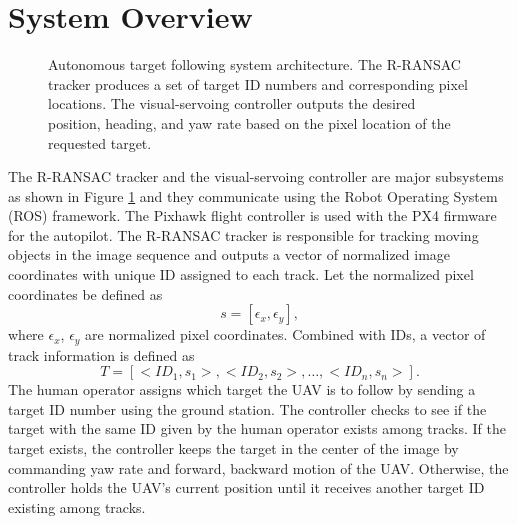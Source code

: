 \section{System Overview}
\begin{figure}[htbp]
	\centering
	\caption[Autonomous target following system architecture.]{Autonomous target following system architecture. The R-RANSAC tracker produces a set of target ID numbers and corresponding pixel locations. The visual-servoing controller outputs the desired position, heading, and yaw rate based on the pixel location of the requested target.}
	\label{system}
\end{figure}
The R-RANSAC tracker and the visual-servoing controller are major subsystems as shown in Figure \ref{system} and they communicate using the Robot Operating System (ROS) framework. The Pixhawk flight controller is used with the PX4 firmware for the autopilot. The R-RANSAC tracker is responsible for tracking moving objects in the image sequence and outputs a vector of normalized image coordinates with unique ID assigned to each track. Let the normalized pixel coordinates be defined as 
\begin{equation}
s = [\epsilon_x, \epsilon_y],
\end{equation} where $\epsilon_x$, $\epsilon_y$ are normalized pixel coordinates. Combined with IDs, a vector of track information is defined as 
\begin{equation}
T = [<ID_1, s_1>, <ID_2, s_2>, \dots, <ID_n, s_n>].
\end{equation}
The human operator assigns which target the UAV is to follow by sending a target ID number using the ground station. The controller checks to see if the target with the same ID given by the human operator exists among tracks. If the target exists, the controller keeps the target in the center of the image by commanding yaw rate and forward, backward motion of the UAV. Otherwise, the controller holds the UAV's current position until it receives another target ID existing among tracks. 

